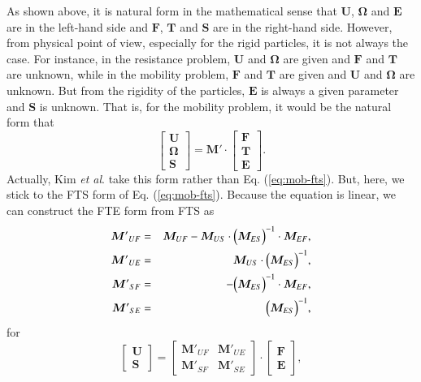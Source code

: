 \documentclass{book}
\begin{document}
As shown above, it is natural form in the mathematical sense
that $\bm{U}$, $\bm{\Omega}$ and $\bm{E}$ are in the left-hand side
and $\bm{F}$, $\bm{T}$ and $\bm{S}$ are in the right-hand side.
However, from physical point of view, especially for the rigid particles,
it is not always the case.
For instance, in the resistance problem,
$\bm{U}$ and $\bm{\Omega}$ are given and
$\bm{F}$ and $\bm{T}$ are unknown,
while in the mobility problem,
$\bm{F}$ and $\bm{T}$ are given and
$\bm{U}$ and $\bm{\Omega}$ are unknown.
But from the rigidity of the particles,
$\bm{E}$ is always a given parameter and
$\bm{S}$ is unknown.
That is, for the mobility problem, it would be the natural form that
\begin{equation}
  \left[
    \begin{array}{c}
      \bm{U}\\
      \bm{\Omega}\\
      \bm{S}
    \end{array}
  \right]
  =
  \bm{M}'
  \cdot
  \left[
    \begin{array}{c}
      \bm{F}\\
      \bm{T}\\
      \bm{E}
    \end{array}
  \right]
  .
\end{equation}
Actually, Kim {\it et al}.\cite{KimMifflin1985} take this form
rather than Eq. (\ref{eq:mob-fts}).
But, here, we stick to the FTS form of Eq. (\ref{eq:mob-fts}).
Because the equation is linear,
we can construct the FTE form from FTS as
\begin{eqnarray}
  {\bm{M}'}_{UF}
  &=&
  \bm{M}_{UF}
  -
  \bm{M}_{US}
  \cdot
  \Bigl(
  \bm{M}_{ES}
  \Bigr)^{-1}
  \cdot
  \bm{M}_{EF}
  ,\\
  {\bm{M}'}_{UE}
  &=&
  \bm{M}_{US}
  \cdot
  \Bigl(
    \bm{M}_{ES}
  \Bigr)^{-1}
  ,\\
  {\bm{M}'}_{SF}
  &=&
  -
  \Bigl(
    \bm{M}_{ES}
  \Bigr)^{-1}
  \cdot
  \bm{M}_{EF}
  ,\\
  {\bm{M}'}_{SE}
  &=&
  \Bigl(
    \bm{M}_{ES}
  \Bigr)^{-1}
  ,
\end{eqnarray}
for
\begin{equation}
  \left[
    \begin{array}{c}
      \bm{U}\\
      \bm{S}
    \end{array}
  \right]
  =
  \left[
    \begin{array}{cc}
      {\bm{M}'}_{UF} & {\bm{M}'}_{UE}\\
      {\bm{M}'}_{SF} & {\bm{M}'}_{SE}
    \end{array}
  \right]
  \cdot
  \left[
    \begin{array}{c}
      \bm{F}\\
      \bm{E}
    \end{array}
  \right]
  ,
\end{equation}
\end{document}
